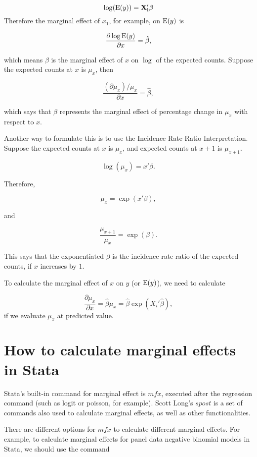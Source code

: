 \begin{equation}
\log ({\rm E}( y) )=\bf X_i' \beta
\end{equation}
Therefore the marginal effect of $x_1$, for example, on ${\rm E} (y)$ is

\[ { \frac{\partial \log {\rm E} (y) }{\partial x}} = \hat \beta , \]

which means $\beta$ is the marginal effect of $x$ on $\log$ of the expected counts. Suppose the expected counts at $x$ is $\mu_{x}$, then 

\[ { \frac{(\partial \mu_x) / \mu_x }{\partial x}} = \hat \beta , \]

which says that $\beta$ represents the marginal effect of percentage change in $\mu_x$ with respect to $x$.

Another way to formulate this is to use the Incidence Rate Ratio Interpretation.  Suppose the expected counts at $x$ is $\mu_{x}$, and expected counts at $x+1$ is $\mu_{x+1}$.

\[  \log (\mu_x) = x' \beta. \]

Therefore,

\begin{equation}
\mu_{x} = \exp (x' \beta), 
\end{equation}

and 

\begin{equation}
\frac{\mu_{x+1}}{\mu_{x}} = \exp ( \beta). 
\end{equation}

This says that the exponentiated $\beta$ is the incidence rate ratio of the expected counts, if $x$ increases by $1$.  

To calculate the marginal effect of $x$ on $y$ (or ${\rm E} (y)$), we need to calculate 

\[\frac{ \partial \mu_x} {\partial x} = \hat \beta \mu_x = \hat \beta \exp(X_i' \hat \beta) , \]
if we evaluate $\mu_x$ at predicted value.

\section{How to calculate marginal effects in Stata}

Stata's built-in command for marginal effect is $mfx$, executed after
the regression command (such as logit or poisson, for example).  Scott
Long's $spost$ is a set of commands also used to calculate marginal
effects, as well as other functionalities.

There are different options for $mfx$ to calculate different marginal
effects.  For example, to calculate marginal effects for panel data
negative binomial models in Stata, we should use the command

